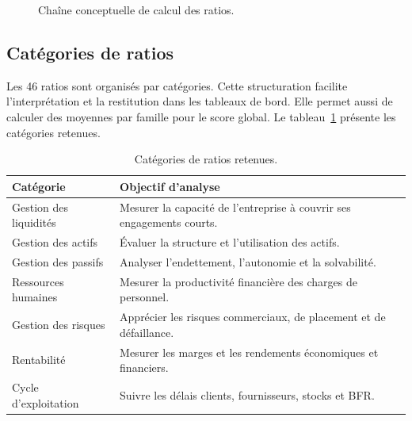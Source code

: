\begin{figure}[H]
\centering
{}
\caption[Chaîne de calcul des ratios]{Chaîne conceptuelle de calcul des ratios.}
\label{fig:chaineratios}
\end{figure}

\subsection{Catégories de ratios}
\par Les 46 ratios sont organisés par catégories. Cette structuration facilite
l'interprétation et la restitution dans les tableaux de bord. Elle permet aussi
de calculer des moyennes par famille pour le score global. Le
tableau~\ref{tab:categoriesratios} présente les catégories retenues.

\begin{table}[H]
\centering
\caption[Catégories de ratios]{Catégories de ratios retenues.}
\label{tab:categoriesratios}
\begin{tabularx}{\linewidth}{|p{3.4cm}|X|}
\hline
\textbf{Catégorie} & \textbf{Objectif d'analyse} \\ \hline
Gestion des liquidités & Mesurer la capacité de l'entreprise à couvrir ses engagements courts. \\ \hline
Gestion des actifs & Évaluer la structure et l'utilisation des actifs. \\ \hline
Gestion des passifs & Analyser l'endettement, l'autonomie et la solvabilité. \\ \hline
Ressources humaines & Mesurer la productivité financière des charges de personnel. \\ \hline
Gestion des risques & Apprécier les risques commerciaux, de placement et de défaillance. \\ \hline
Rentabilité & Mesurer les marges et les rendements économiques et financiers. \\ \hline
Cycle d'exploitation & Suivre les délais clients, fournisseurs, stocks et BFR. \\ \hline
\end{tabularx}
\end{table}

